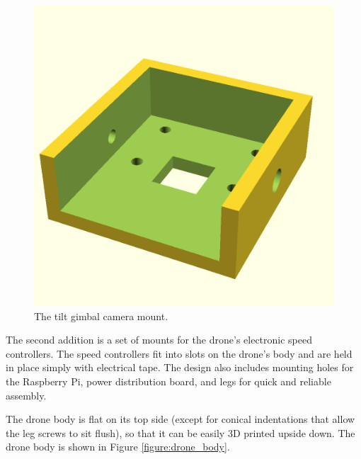 \begin{figure}
    \centering
    \includegraphics[width=0.75\columnwidth]{images/gimbal_camera_mount.png}
    \caption{The tilt gimbal camera mount.}
    \label{figure:tilt_gimbal_camera_mount}
\end{figure}

The second addition is a set of mounts for the drone's electronic speed controllers.
The speed controllers fit into slots on the drone's body and are held in place simply with electrical tape.
The design also includes mounting holes for the Raspberry Pi, power distribution board,
and legs for quick and reliable assembly.

The drone body is flat on its top side (except for conical indentations that allow the leg screws to sit flush), so that
it can be easily 3D printed upside down.
The drone body is shown in Figure \ref{figure:drone_body}.

